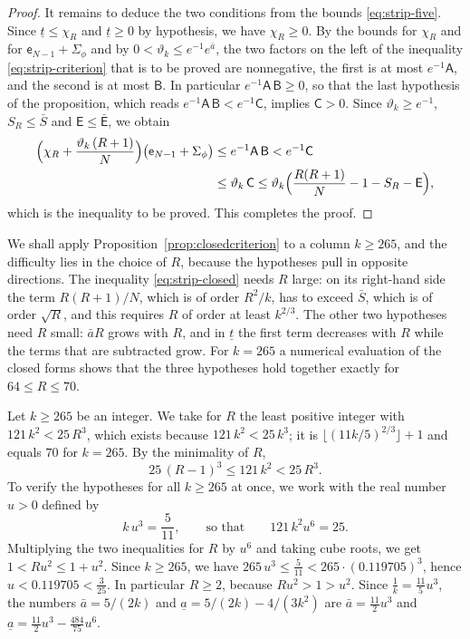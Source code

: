 \documentclass{amsart}
\makeatletter
\theoremstyle{definition}
\theoremstyle{remark}
\numberwithin{equation}{section}
\def\subsection{\@startsection{subsection}{2}\z@{.5\linespacing\@plus.7\linespacing}{-.5em}{\normalfont\bfseries\boldmath}}
\makeatother
\begin{document}
\begin{proof}
It remains to deduce the two conditions from the bounds \eqref{eq:strip-five}. Since $\underline t\le\chi_R$ and $\underline t\ge 0$ by hypothesis, we have $\chi_R\ge 0$. By the bounds for $\chi_R$ and for $\mathsf e_{N-1}+\Sigma_\phi$ and by $0<\vartheta_k\le e^{-1}e^{\bar a}$, the two factors on the left of the inequality \eqref{eq:strip-criterion} that is to be proved are nonnegative, the first is at most $e^{-1}\mathsf{A}$, and the second is at most $\mathsf{B}$. In particular $e^{-1}\mathsf{A}\,\mathsf{B}\ge 0$, so that the last hypothesis of the proposition, which reads $e^{-1}\mathsf{A}\,\mathsf{B}<e^{-1}\mathsf{C}$, implies $\mathsf{C}>0$. Since $\vartheta_k\ge e^{-1}$, $S_R\le\bar S$ and $\mathsf E\le\bar{\mathsf E}$, we obtain
\begin{align*}
\Bigl(\chi_R+\frac{\vartheta_k\,(R+1)}{N}\Bigr)\bigl(\mathsf e_{N-1}+\Sigma_\phi\bigr)
&\le e^{-1}\mathsf{A}\,\mathsf{B}<e^{-1}\mathsf{C}\\
&\le\vartheta_k\,\mathsf{C}\le\vartheta_k\Bigl(\frac{R(R+1)}{N}-1-S_R-\mathsf E\Bigr),
\end{align*}
which is the inequality to be proved. This completes the proof.
\end{proof}

\subsection{The choice of $R$}\label{subsec:strip-scale}

We shall apply Proposition~\ref{prop:closedcriterion} to a column $k\ge 265$, and the difficulty lies in the choice of $R$, because the hypotheses pull in opposite directions. The inequality \eqref{eq:strip-closed} needs $R$ large: on its right-hand side the term $R(R+1)/N$, which is of order $R^2/k$, has to exceed $\bar S$, which is of order $\sqrt R$, and this requires $R$ of order at least $k^{2/3}$. The other two hypotheses need $R$ small: $\bar aR$ grows with $R$, and in $\underline t$ the first term decreases with $R$ while the terms that are subtracted grow. For $k=265$ a numerical evaluation of the closed forms shows that the three hypotheses hold together exactly for $64\le R\le 70$.

Let $k\ge 265$ be an integer. We take for $R$ the least positive integer with $121\,k^2<25\,R^3$, which exists because $121\,k^2<25\,k^3$; it is $\lfloor(11k/5)^{2/3}\rfloor+1$ and equals $70$ for $k=265$. By the minimality of $R$,
\[
25\,(R-1)^3\le 121\,k^2<25\,R^3.
\]
To verify the hypotheses for all $k\ge 265$ at once, we work with the real number $u>0$ defined by
\[
k\,u^3=\frac{5}{11},\qquad\text{so that}\qquad 121\,k^2u^6=25.
\]
Multiplying the two inequalities for $R$ by $u^6$ and taking cube roots, we get $1<Ru^2\le 1+u^2$. Since $k\ge 265$, we have $265\,u^3\le\frac{5}{11}<265\cdot(0.119705)^3$, hence $u<0.119705<\frac{3}{25}$. In particular $R\ge 2$, because $Ru^2>1>u^2$. Since $\frac1k=\frac{11}{5}u^3$, the numbers $\bar a=5/(2k)$ and $\underline a=5/(2k)-4/(3k^2)$ are $\bar a=\frac{11}{2}u^3$ and $\underline a=\frac{11}{2}u^3-\frac{484}{75}u^6$.
\end{document}
